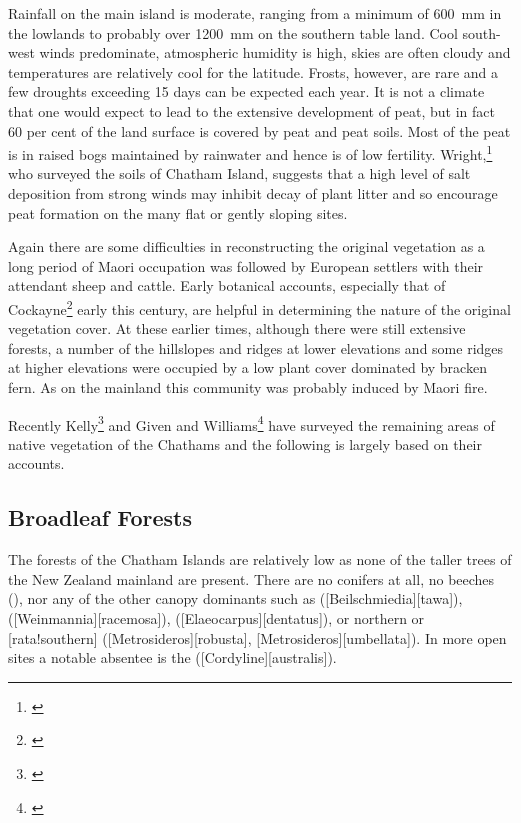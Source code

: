 Rainfall on the main island is moderate, ranging from a minimum of \SI{600}{\milli\metre} in the lowlands to probably over \SI{1200}{\milli\metre} on the southern table land.
Cool south-west winds predominate, atmospheric humidity is high, skies are often cloudy and temperatures are relatively cool for the latitude.
Frosts, however, are rare and a few droughts exceeding 15 days can be expected each year.
It is not a climate that one would expect to lead to the extensive development of peat, but in fact 60 per cent of the land surface is covered by peat and peat soils.
Most of the peat is in raised bogs maintained by rainwater and hence is of low fertility.
Wright,\footnote{\cite{wright1959soils}} who surveyed the soils of Chatham Island, suggests that a high level of salt deposition from strong winds may inhibit decay of plant litter and so encourage peat formation on the many flat or gently sloping sites.

Again there are some difficulties in reconstructing the original vegetation as a long period of Maori occupation was followed by European settlers with their attendant sheep and cattle.
Early botanical accounts, especially that of Cockayne\footnote{\cite{cockayne1902chatham}} early this century, are helpful in determining the nature of the original vegetation cover.
At these earlier times, although there were still extensive forests, a number of the hillslopes and ridges at lower elevations and some ridges at higher elevations were occupied by a low plant cover dominated by bracken fern.
As on the mainland this community was probably induced by Maori fire.

Recently Kelly\footnote{\cite{kelly1983distribution}} and Given and Williams\footnote{\cite{given1984conservation}} have surveyed the remaining areas of native vegetation of the Chathams and the following is largely based on their accounts.

\subsection{Broadleaf Forests}

The forests of the Chatham Islands are relatively low as none of the taller trees of the New Zealand mainland are present.
There are no conifers at all, no beeches (), nor any of the other canopy dominants such as  ([Beilschmiedia][tawa]),  ([Weinmannia][racemosa]),  ([Elaeocarpus][dentatus]), or northern or [rata!southern] ([Metrosideros][robusta], [Metrosideros][umbellata]).
In more open sites a notable absentee is the  ([Cordyline][australis]).

